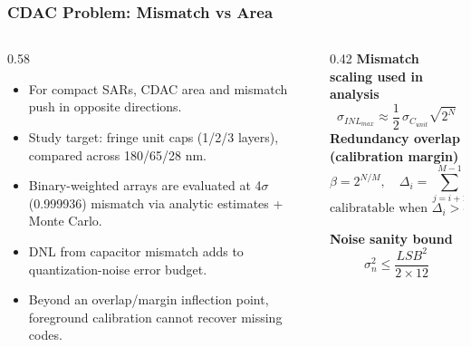 \documentclass[aspectratio=169]{beamer}
\begin{document}
\begin{frame}
  \frametitle{CDAC Problem: Mismatch vs Area}
  \small
  \begin{columns}
    \begin{column}{0.58\textwidth}
      \begin{itemize}
        \item For compact SARs, CDAC area and mismatch push in opposite directions.
        \item Study target: fringe unit caps (1/2/3 layers), compared across 180/65/28 nm.
        \item Binary-weighted arrays are evaluated at 4$\sigma$ (0.999936) mismatch via analytic estimates + Monte Carlo.
        \item DNL from capacitor mismatch adds to quantization-noise error budget.
        \item Beyond an overlap/margin inflection point, foreground calibration cannot recover missing codes.
      \end{itemize}
    \end{column}
    \begin{column}{0.42\textwidth}
      \tiny
      \textbf{Mismatch scaling used in analysis}
      \[
      \sigma_{INL_{max}} \approx \frac{1}{2}\,\sigma_{C_{unit}}\sqrt{2^N}
      \]
      \vspace{-0.8em}
      \textbf{Redundancy overlap (calibration margin)}
      \[
      \beta = 2^{N/M}, \quad
      \Delta_i = \sum_{j=i+1}^{M-1} W_j - W_i
      \]
      \vspace{-0.8em}
      \[
      \text{calibratable when } \Delta_i > 4\sigma_{\text{equiv},i}
      \]
      \vspace{-0.2em}

      \textbf{Noise sanity bound}
      \[
      \sigma_n^2 \le \frac{LSB^2}{2 \times 12}
      \]
    \end{column}
  \end{columns}
\end{frame}
\end{document}
